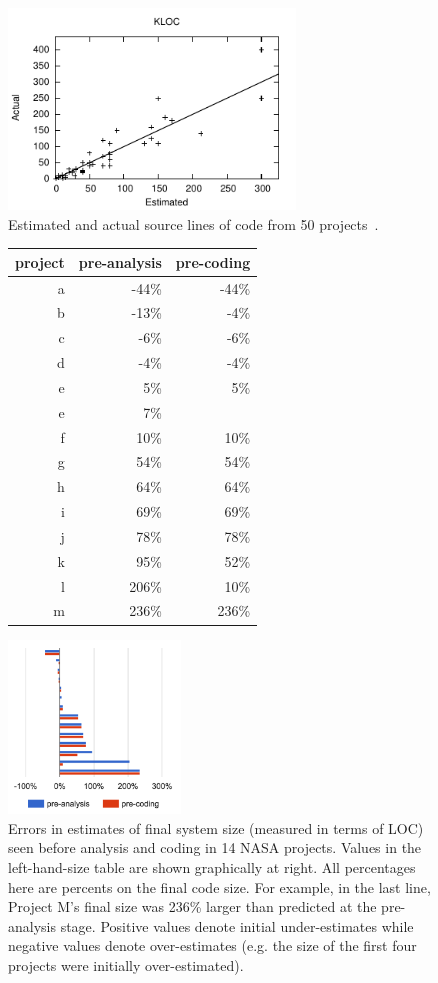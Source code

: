 \documentclass[final,twocolumn,5p]{elsarticle}
\theoremstyle{break}
\begin{document}
 
\begin{figure}
\includegraphics[width=3in]{data.pdf}
\caption{Estimated and actual source lines of code from 50 projects~\cite{jones07a}.}\label{fig:ea}
\end{figure}

 \begin{figure}
      \scriptsize
      \begin{minipage}{.5\linewidth}
      \begin{tabular}{r|rr|}
   project & pre-analysis&pre-coding\\\hline
a&-44\%&-44\%\\
b&-13\%&-4\%\\
c&-6\%&-6\%\\
d&-4\%&-4\%\\
e&5\%&5\%\\
e&7\%&\\
f&10\%&10\%\\
g&54\%&54\%\\
h&64\%&64\%\\
i&69\%&69\%\\
j&78\%&78\%\\
k&95\%&52\%\\
l&206\%&10\%\\
m&236\%&236\%
      \end{tabular}\end{minipage} \begin{minipage}{.33\linewidth}
        \includegraphics[width=1.8in]{nasadata.png}
        \end{minipage}
      \caption{Errors in estimates of final system size (measured in terms of LOC)
        seen before analysis and coding in 14 NASA projects. Values in the left-hand-size table
        are shown graphically at right.
        All percentages here are percents on the final code size. For example, in the last
        line, Project M's final size was 236\% larger than predicted at the pre-analysis stage.
        Positive values denote initial under-estimates while negative values denote over-estimates
        (e.g. the size of the first four projects were initially over-estimated).}
        \label{fig:nasaloc}
    \end{figure}
\end{document}
